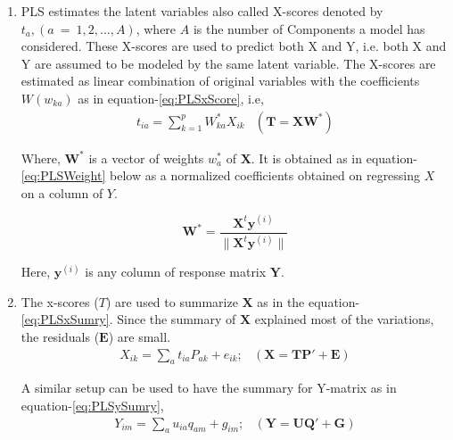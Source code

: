 \documentclass[12pt, lot, lof]{thesis}\usepackage[]{graphicx}\usepackage[]{color}
\newcommand{\bs}[1]{\ensuremath{\boldsymbol{#1}}}
\begin{document}
\begin{enumerate}
\item{
PLS estimates the latent variables also called X-scores denoted by $t_a, (a~=~1,2,\ldots,A)$, where $A$ is the number of Components a model has considered. These X-scores are used to predict both X and Y, i.e. both X and Y are assumed to be modeled by the same latent variable. The X-scores are estimated as linear combination of original variables with the coefficients $W(w_{ka})$ as in equation-\ref{eq:PLSxScore}, i.e,
\begin{eqnarray}
\label{eq:PLSxScore}
    t_{ia}=\sum_{k=1}^{p}{W^*_{ka}X_{ik}} & (\bs{T}=\bs{X}\bs{W^*})
\end{eqnarray}

Where, $\bs{W}^*$ is a vector of weights $w^*_a$ of \bs{X}. It is obtained as in equation-\ref{eq:PLSWeight} below as a normalized coefficients obtained on regressing $X$ on a column of $Y$.

\begin{equation}
\label{eq:PLSWeight}
\bs{W}^*=\frac{\bs{X}^t\bs{y}^{(i)}}{\|\bs{X}^t\bs{y}^{(i)}\|}
\end{equation}

Here, $\bs{y}^{(i)}$ is any column of response matrix $\bs{Y}$.
}
\item{
The x-scores ($T$) are used to summarize \bs{X} as in the equation-\ref{eq:PLSxSumry}. Since the summary of \bs{X} explained most of the variations, the residuals (\bs{E}) are small.
\begin{eqnarray}
X_{ik} =\sum_a{t_{ia}P_{ak}+e_{ik}}; & (\bs{X}=\bs{T}\bs{P'}+\bs{E}) \label{eq:PLSxSumry} 
\end{eqnarray}

A similar setup can be used to have the summary for Y-matrix as in equation-\ref{eq:PLSySumry},
\begin{eqnarray}
Y_{im} =\sum_a{u_{ia}q_{am}+g_{im}}; & (\bs{Y}=\bs{U}\bs{Q'}+\bs{G}) \label{eq:PLSySumry}
\end{eqnarray}

}
\end{enumerate}
\end{document}
